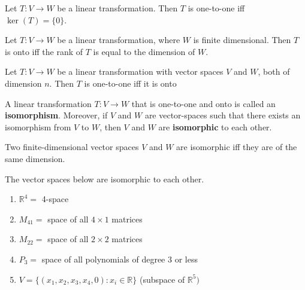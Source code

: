 \documentclass{report}
\begin{document}
\begin{tcolorbox}[title = One-to-One Transformations]
	Let $T: V \to W$ be a linear transformation. Then $T$ is one-to-one iff $\ker(T) = \{ 0\}$.
\end{tcolorbox}

\begin{tcolorbox}[title = Onto Linear Transformations]
	Let $T: V \to W$ be a linear transformation, where $W$ is finite dimensional. Then $T$ is onto iff the rank of $T$ is equal to the dimension of $W$.
\end{tcolorbox}

\begin{tcolorbox}[title = One-to-One and Onto Linear Transformations]
		Let $T: V \to W$ be a linear transformation with vector spaces $V$ and $W$, both of dimension $n$. Then $T$ is one-to-one iff it is onto
\end{tcolorbox}

\begin{tcolorbox}[title = Definition of Isomorphism]
	A linear transformation $T: V \to W$ that is one-to-one and onto is called an \textbf{isomorphism}. Moreover, if $V$ and $W$ are vector-spaces such that there exists an isomorphism from $V$ to $W$, then $V$ and $W$ are \textbf{isomorphic} to each other.
\end{tcolorbox}

\begin{tcolorbox}[title = Isomorphic Spaces and DImensions]
	Two finite-dimensional vector spaces $V$ and $W$ are isomorphic iff they are of the same dimension.
\end{tcolorbox}

\begin{tcolorbox}[title = Isomorphic Vector Spaces]
	The vector spaces below are isomorphic to each other.
	
	\begin{enumerate}
		\item $\mathbb{R}^4 = $ 4-space
		\item $M_{41} = $ space of all $4 \times 1$ matrices
		\item  $M_{22} = $ space of all $2 \times 2$ matrices
		\item $P_3 = $ space of all polynomials of degree 3 or less
		\item $V = \{ (x_1,x_2,x_3,x_4,0): x_i \in \mathbb{R}\}$ (subspace of $\mathbb{R}^5)$
	\end{enumerate}
\end{tcolorbox}
\end{document}
